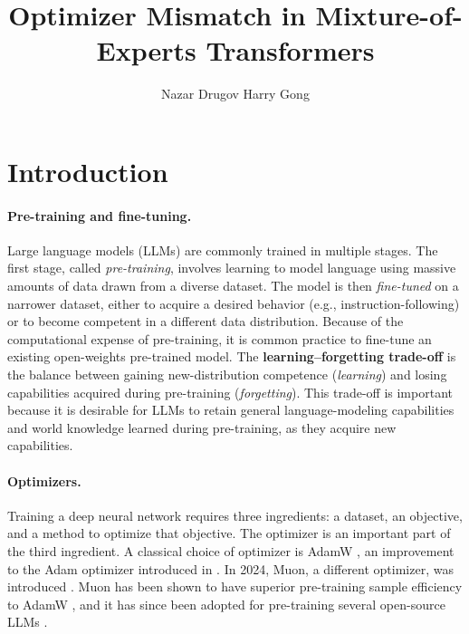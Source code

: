 \documentclass[11pt,a4paper]{article}
\title{Optimizer Mismatch in Mixture-of-Experts Transformers}
\author{Nazar Drugov \And Harry Gong}
\begin{document}
\maketitle


\section{Introduction}
\label{sec:intro}
\paragraph{Pre-training and fine-tuning.} Large language models (LLMs) are commonly trained in multiple stages. The first stage, called \textit{pre-training}, involves learning to model language using massive amounts of data drawn from a diverse dataset. The model is then \textit{fine-tuned} on a narrower dataset, either to acquire a desired behavior (e.g., instruction-following) or to become competent in a different data distribution. Because of the computational expense of pre-training, it is common practice to fine-tune an existing open-weights pre-trained model. The \textbf{learning--forgetting trade-off} is the balance between gaining new-distribution competence (\textit{learning}) and losing capabilities acquired during pre-training (\textit{forgetting}). This trade-off is important because it is desirable for LLMs to retain general language-modeling capabilities and world knowledge learned during pre-training, as they acquire new capabilities.

\paragraph{Optimizers.}
Training a deep neural network requires three ingredients: a dataset, an objective, and a method to optimize that objective. The optimizer is an important part of the third ingredient. 
A classical choice of optimizer is AdamW \cite{loshchilov2019decoupledweightdecayregularization}, an improvement to the Adam optimizer introduced in \cite{kingma2017adammethodstochasticoptimization}. In 2024, Muon, a different optimizer, was introduced \cite{jordan2024muon}. Muon has been shown to have superior pre-training sample efficiency to AdamW \cite{liu2025muon, jordan2024muon}, and it has since been adopted for pre-training several open-source LLMs \cite{kimiteam2026kimik2openagentic, glm5team2026glm5vibecodingagentic}. 
\end{document}
